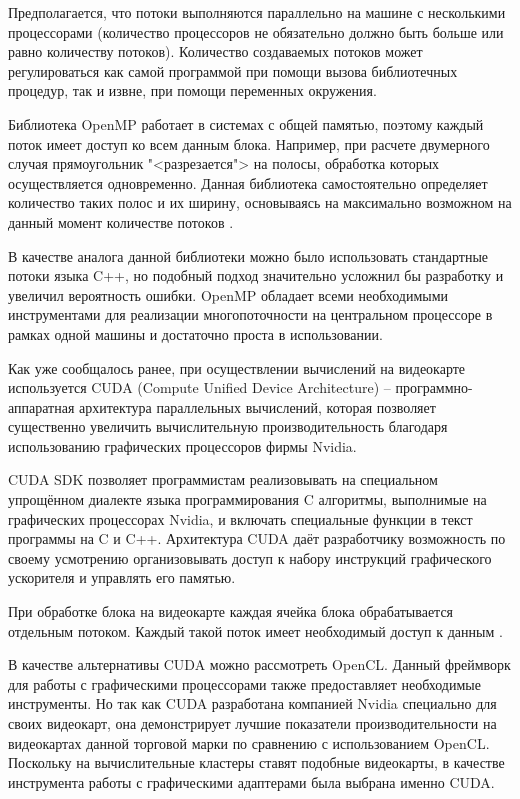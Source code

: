 \documentclass[a4paper, 14pt]{extarticle}
\theoremstyle{definition}
\begin{document}
\par Предполагается, что потоки выполняются параллельно на машине с несколькими процессорами (количество процессоров не обязательно должно быть больше или равно количеству потоков). Количество создаваемых потоков может регулироваться как самой программой при помощи вызова библиотечных процедур, так и извне, при помощи переменных окружения.

\par Библиотека OpenMP работает в системах с общей памятью, поэтому каждый поток имеет доступ ко всем данным блока. Например, при расчете двумерного случая прямоугольник "<разрезается"> на полосы, обработка которых осуществляется одновременно. Данная библиотека самостоятельно определяет количество таких полос и их ширину, основываясь на максимально возможном на данный момент количестве потоков \cite{OpenMP}.

\par В качестве аналога данной библиотеки можно было использовать стандартные потоки языка C++, но подобный подход значительно усложнил бы разработку и увеличил вероятность ошибки. OpenMP обладает всеми необходимыми инструментами для реализации многопоточности на центральном процессоре в рамках одной машины и достаточно проста в использовании.

\par Как уже сообщалось ранее, при осуществлении вычислений на видеокарте используется CUDA (Compute Unified Device Architecture) -- программно-аппаратная архитектура параллельных вычислений, которая позволяет существенно увеличить вычислительную производительность благодаря использованию графических процессоров фирмы Nvidia.

\par CUDA SDK позволяет программистам реализовывать на специальном упрощённом диалекте языка программирования C алгоритмы, выполнимые на графических процессорах Nvidia, и включать специальные функции в текст программы на C и C++. Архитектура CUDA даёт разработчику возможность по своему усмотрению организовывать доступ к набору инструкций графического ускорителя и управлять его памятью.

\par При обработке блока на видеокарте каждая ячейка блока обрабатывается отдельным потоком. Каждый такой поток имеет необходимый доступ к данным \cite{CUDA}.

\par В качестве альтернативы CUDA можно рассмотреть OpenCL. Данный фреймворк для работы с графическими процессорами также предоставляет необходимые инструменты. Но так как CUDA разработана компанией Nvidia специально для своих видеокарт, она демонстрирует лучшие показатели производительности на видеокартах данной торговой марки по сравнению с использованием OpenCL. Поскольку на вычислительные кластеры ставят подобные видеокарты, в качестве инструмента работы с графическими адаптерами была выбрана именно CUDA.
\end{document}
